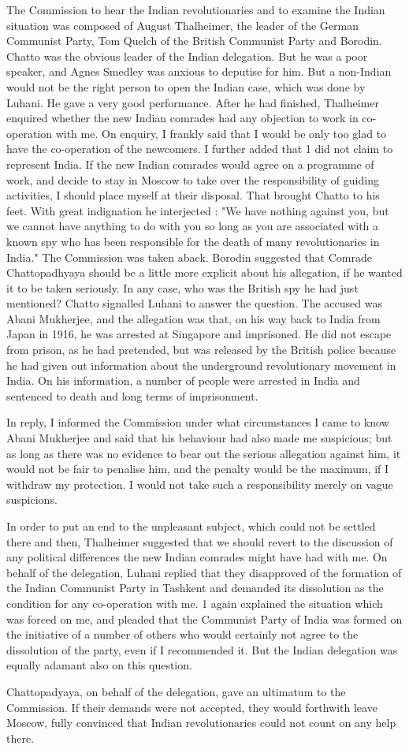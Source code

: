The Commission to hear the Indian revolutionaries and to examine the Indian situation was composed of August Thalheimer, the leader of the German Communist Party, Tom Quelch of the British Communist Party and Borodin. Chatto was the obvious leader of the Indian delegation. But he was a poor speaker, and Agnes Smedley was anxious to deputise for him. But a non-Indian would not be the right person to open the Indian case, which was done by Luhani. He gave a very good performance. After he had finished, Thalheimer enquired whether the new Indian comrades had any objection to work in co-operation with me. On enquiry, I frankly said that I would be only too glad to have the co-operation of the newcomers. I further added that 1 did not claim to represent India. If the new Indian comrades would agree on a programme of work, and decide to stay in Moscow to take over the responsibility of guiding activities, I should place myself at their disposal. That brought Chatto to his feet. With great indignation he interjected : "We have nothing against you, but we cannot have anything to do with you so long as you are associated with a known spy who has been responsible for the death of many revolutionaries in India." The Commission was taken aback. Borodin suggested that Comrade Chattopadhyaya should be a little more explicit about his allegation, if he wanted it to be taken seriously. In any case, who was the British spy he had just mentioned? Chatto signalled Luhani to answer the question. The accused was Abani Mukherjee, and the allegation was that, on his way back to India from Japan in 1916, he was arrested at Singapore and imprisoned. He did not escape from prison, as he had pretended, but was released by the British police because he had given out information about the underground revolutionary movement in India. On his information, a number of people were arrested in India and sentenced to death and long terms of imprisonment. 

In reply, I informed the Commission under what circumstances I came to know Abani Mukherjee and said that his behaviour had also made me suspicious; but as long as there was no evidence to bear out the serious allegation against him, it would not be fair to penalise him, and the penalty would be the maximum, if I withdraw my protection. I would not take such a responsibility merely on vague suspicions. 

In order to put an end to the unpleasant subject, which could not be settled there and then, Thalheimer suggested that we should revert to the discussion of any political differences the 
new Indian comrades might have had with me. On behalf of the delegation, Luhani replied that they disapproved of the formation of the Indian Communist Party in Tashkent and demanded its dissolution as the condition for any co-operation with me. 1 again explained the situation which was forced on me, and pleaded that the Communist Party of India was formed on the initiative of a number of others who would certainly not agree to the dissolution of the party, even if I recommended it. But the Indian delegation was equally adamant also on this 
question. 

Chattopadyaya, on behalf of the delegation, gave an ultimatum to the Commission. If their demands were not accepted, they would forthwith leave Moscow, fully convinced that Indian revolutionaries could not count on any help there.
